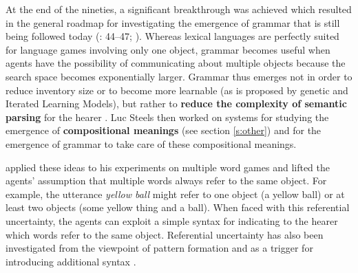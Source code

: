 At the end of the nineties, a significant breakthrough was achieved which resulted in the general roadmap for investigating the emergence of grammar that is still being followed today (\citealp{steels99talking-heads}: 44--47; \citealp{steels00emergence}). Whereas lexical languages are perfectly suited for language games involving only one object, grammar becomes useful when agents have the possibility of communicating about multiple objects because the search space becomes exponentially larger. Grammar thus emerges not in order to reduce inventory size or to become more learnable (as is proposed by genetic and Iterated Learning Models), but rather to {\bfseries reduce the complexity of semantic parsing} for the hearer \citep[this idea has been formalized and operationalized by][]{steels05what}. Luc Steels then worked on systems for studying the emergence of {\bfseries compositional meanings} (see section \ref{s:other}) and for the emergence of grammar to take care of these compositional meanings.

\citet{vanlooveren05design} applied these ideas to his experiments on multiple word games and lifted the agents' assumption that multiple words always refer to the same object. For example, the utterance {\em yellow ball} might refer to one object (a yellow ball) or at least two objects (some yellow thing and a ball). When faced with this referential uncertainty, the agents can exploit a simple syntax for indicating to the hearer which words refer to the same object. Referential uncertainty has also been investigated from the viewpoint of pattern formation \citep[as another pregrammatical stage,][]{steels07multilevel} and as a trigger for introducing additional syntax \citep{steels06how-grammar}.

